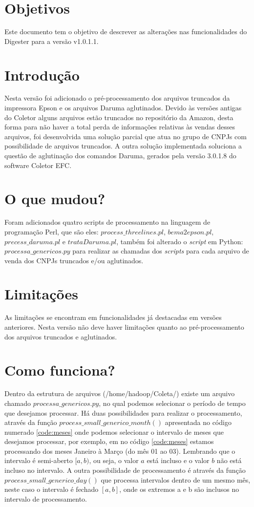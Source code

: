\documentclass{article}      %
\newcommand{\versiondigester}{v1.0.1.1}
\begin{document}
\section{Objetivos}

Este documento tem o objetivo de descrever as alterações nas funcionalidades do Digester para a versão \versiondigester. 


\section{Introdução}     
Nesta versão foi adicionado o pré-processamento dos arquivos truncados da impressora Epson e os arquivos Daruma aglutinados. Devido às versões antigas do Coletor alguns arquivos estão truncados no repositório da Amazon, desta forma para não haver a total perda de informações relativas às vendas desses arquivos, foi desenvolvida uma solução parcial que atua no grupo de CNPJs com possibilidade de arquivos truncados. A outra solução implementada soluciona a questão de aglutinação dos comandos Daruma, gerados pela versão 3.0.1.8 do software Coletor EFC.

\section{O que mudou?}
Foram adicionados quatro scripts de processamento na linguagem de programação Perl, que são eles: $process\_threelines.pl$, $bema2epson.pl$, $precess\_daruma.pl$ e $trataDaruma.pl$, também foi alterado o \emph{script} em Python: $processa\_genericos.py$ para realizar as chamadas dos \emph{scripts} para cada arquivo de venda dos CNPJs truncados e/ou aglutinados. 

\section{Limitações}
As limitações se encontram em funcionalidades já destacadas em versões anteriores. Nesta versão não deve haver limitações quanto ao pré-processamento dos arquivos truncados e aglutinados.

\section{Como funciona?}

Dentro da estrutura de arquivos (/home/hadoop/Coleta/) existe um arquivo chamado $processa\_genericos.py$, 
no qual podemos selecionar o período de tempo que desejamos processar. Há duas possibilidades para realizar o processamento, através da função $process\_small\_generico\_month()$ apresentada no código numerado \ref{code:meses} onde podemos selecionar o intervalo de meses que desejamos processar, por exemplo, em no código \ref{code:meses} estamos processando dos meses Janeiro à Março (do mês 01 ao 03). Lembrando que o intervalo é semi-aberto $[a,b)$, ou seja, o valor $a$ está incluso e o valor $b$ não está incluso no intervalo. A outra possibilidade de processamento é através da função $process\_small\_generico\_day()$ que processa intervalos dentro de um mesmo mês, neste caso o intervalo é fechado $[a,b]$, onde os extremos a e b são inclusos no intervalo de processamento.    
\end{document}
